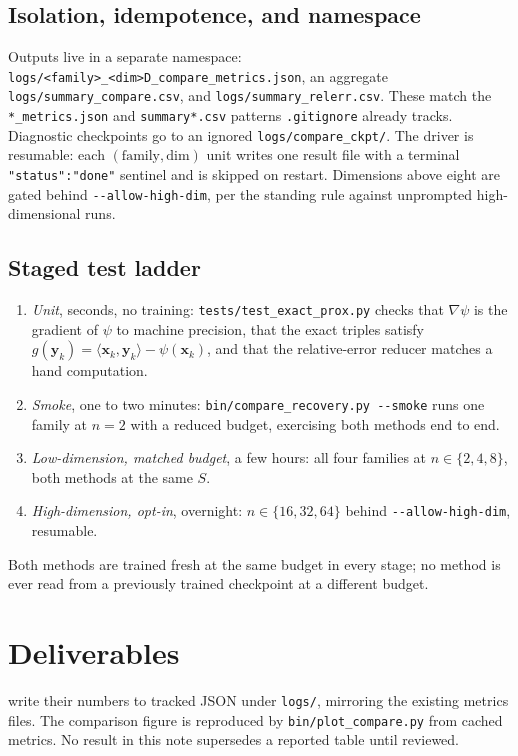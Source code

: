 \documentclass[11pt]{article}
\theoremstyle{definition}
\theoremstyle{remark}
\def\bx {\boldsymbol{x}}
\def\by {\boldsymbol{y}}
\begin{document}
\subsection{Isolation, idempotence, and namespace}
\label{sub:iso}

Outputs live in a separate namespace: \texttt{logs/<family>\_<dim>D\_compare\_metrics.json}, an aggregate \texttt{logs/summary\_compare.csv}, and \texttt{logs/summary\_relerr.csv}.
These match the \texttt{*\_metrics.json} and \texttt{summary*.csv} patterns \texttt{.gitignore} already tracks.
Diagnostic checkpoints go to an ignored \texttt{logs/compare\_ckpt/}.
The driver is resumable: each $(\text{family},\text{dim})$ unit writes one result file with a terminal \texttt{"status":"done"} sentinel and is skipped on restart.
Dimensions above eight are gated behind \texttt{-{}-allow-high-dim}, per the standing rule against unprompted high-dimensional runs.

\subsection{Staged test ladder}
\label{sub:tests}

\begin{enumerate}
\item[\textnormal{(T1)}] \emph{Unit}, seconds, no training: \texttt{tests/test\_exact\_prox.py} checks that $\nabla\psi$ is the gradient of $\psi$ to machine precision, that the exact triples satisfy $g(\by_{k}) = \langle\bx_{k},\by_{k}\rangle - \psi(\bx_{k})$, and that the relative-error reducer matches a hand computation.
\item[\textnormal{(T2)}] \emph{Smoke}, one to two minutes: \texttt{bin/compare\_recovery.py -{}-smoke} runs one family at $n = 2$ with a reduced budget, exercising both methods end to end.
\item[\textnormal{(T3)}] \emph{Low-dimension, matched budget}, a few hours: all four families at $n \in \{2,4,8\}$, both methods at the same $S$.
\item[\textnormal{(T4)}] \emph{High-dimension, opt-in}, overnight: $n \in \{16,32,64\}$ behind \texttt{-{}-allow-high-dim}, resumable.
\end{enumerate}
Both methods are trained fresh at the same budget in every stage; no method is ever read from a previously trained checkpoint at a different budget.

\section{Deliverables}
\label{sec:deliverables}

 write their numbers to tracked JSON under \texttt{logs/}, mirroring the existing metrics files.
The comparison figure is reproduced by \texttt{bin/plot\_compare.py} from cached metrics.
No result in this note supersedes a reported table until reviewed.
\end{document}
